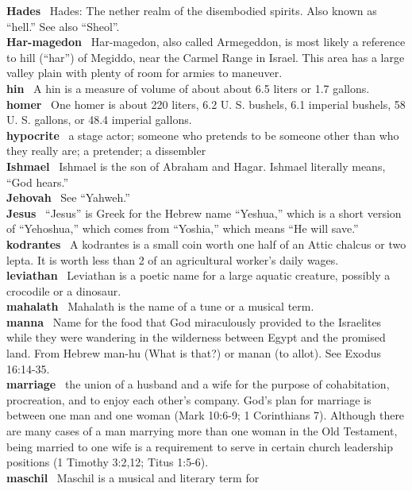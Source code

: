\textbf{Hades}~ Hades: The nether realm of the disembodied spirits. Also
known as ``hell.'' See also ``Sheol''.\\
\textbf{Har-magedon}~ Har-magedon, also called Armegeddon, is most
likely a reference to hill (``har'') of Megiddo, near the Carmel Range
in Israel. This area has a large valley plain with plenty of room for
armies to maneuver.\\
\textbf{hin}~ A hin is a measure of volume of about about 6.5 liters or
1.7 gallons.\\
\textbf{homer}~ One homer is about 220 liters, 6.2 U. S. bushels, 6.1
imperial bushels, 58 U. S. gallons, or 48.4 imperial gallons.\\
\textbf{hypocrite}~ a stage actor; someone who pretends to be someone
other than who they really are; a pretender; a dissembler\\
\textbf{Ishmael}~ Ishmael is the son of Abraham and Hagar. Ishmael
literally means, ``God hears.''\\
\textbf{Jehovah}~ See ``Yahweh.''\\
\textbf{Jesus}~ ``Jesus'' is Greek for the Hebrew name ``Yeshua,'' which
is a short version of ``Yehoshua,'' which comes from ``Yoshia,'' which
means ``He will save.''\\
\textbf{kodrantes}~ A kodrantes is a small coin worth one half of an
Attic chalcus or two lepta. It is worth less than 2 of an agricultural
worker's daily wages.\\
\textbf{leviathan}~ Leviathan is a poetic name for a large aquatic
creature, possibly a crocodile or a dinosaur.\\
\textbf{mahalath}~ Mahalath is the name of a tune or a musical term.\\
\textbf{manna}~ Name for the food that God miraculously provided to the
Israelites while they were wandering in the wilderness between Egypt and
the promised land. From Hebrew man-hu (What is that?) or manan (to
allot). See Exodus 16:14-35.\\
\textbf{marriage}~ the union of a husband and a wife for the purpose of
cohabitation, procreation, and to enjoy each other's company. God's plan
for marriage is between one man and one woman (Mark 10:6-9; 1
Corinthians 7). Although there are many cases of a man marrying more
than one woman in the Old Testament, being married to one wife is a
requirement to serve in certain church leadership positions (1 Timothy
3:2,12; Titus 1:5-6).\\
\textbf{maschil}~ Maschil is a musical and literary term for
